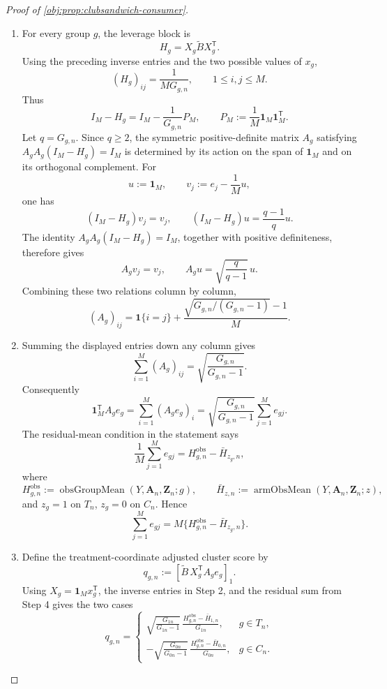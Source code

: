 \documentclass[11pt]{article}
\begin{document}
\begin{proof}[Proof of \cref{obj:prop:clubsandwich-consumer}]
\begin{enumerate}
\item
For every group \(g\), the leverage block is
\[
H_g=X_g\widetilde B X_g^{\mathsf T}.
\]
Using the preceding inverse entries and the two possible values of \(x_g\),
\[
(H_g)_{ij}
=
\frac{1}{M G_{g,n}},
\qquad
1\le i,j\le M.
\]
Thus
\[
I_M-H_g
=
I_M-\frac{1}{G_{g,n}}P_M,
\qquad
P_M:=\frac{1}{M}\mathbf 1_M\mathbf 1_M^{\mathsf T}.
\]
Let \(q=G_{g,n}\).  Since \(q\ge2\), the symmetric positive-definite matrix
\(A_g\) satisfying \(A_gA_g(I_M-H_g)=I_M\) is determined by its action on the
span of \(\mathbf 1_M\) and on its orthogonal complement.  For
\[
u:=\mathbf 1_M,
\qquad
v_j:=e_j-\frac1M u,
\]
one has
\[
(I_M-H_g)v_j=v_j,
\qquad
(I_M-H_g)u=\frac{q-1}{q}u.
\]
The identity \(A_gA_g(I_M-H_g)=I_M\), together with positive definiteness,
therefore gives
\[
A_gv_j=v_j,
\qquad
A_gu=\sqrt{\frac{q}{q-1}}\,u.
\]
Combining these two relations column by column,
\[
(A_g)_{ij}
=
\mathbf 1\{i=j\}
+
\frac{\sqrt{G_{g,n}/(G_{g,n}-1)}-1}{M}.
\]

\item
Summing the displayed entries down any column gives
\[
\sum_{i=1}^{M}(A_g)_{ij}
=
\sqrt{\frac{G_{g,n}}{G_{g,n}-1}}.
\]
Consequently
\[
\mathbf 1_M^{\mathsf T}A_ge_g
=
\sum_{i=1}^{M}(A_ge_g)_i
=
\sqrt{\frac{G_{g,n}}{G_{g,n}-1}}
\sum_{j=1}^{M}e_{gj}.
\]
The residual-mean condition in the statement says
\[
\frac1M\sum_{j=1}^{M}e_{gj}
=
H_{g,n}^{\mathrm{obs}}-\bar H_{z_g,n},
\]
where
\[
H_{g,n}^{\mathrm{obs}}:=\operatorname{obsGroupMean}(Y,\mathbf A_n,\mathbf Z_n;g),
\qquad
\bar H_{z,n}:=\operatorname{armObsMean}(Y,\mathbf A_n,\mathbf Z_n;z),
\]
and \(z_g=1\) on \(T_n\), \(z_g=0\) on \(C_n\).  Hence
\[
\sum_{j=1}^{M}e_{gj}
=
M\{H_{g,n}^{\mathrm{obs}}-\bar H_{z_g,n}\}.
\]

\item
Define the treatment-coordinate adjusted cluster score by
\[
q_{g,n}
:=
\left[
\widetilde B\,X_g^{\mathsf T}A_ge_g
\right]_1 .
\]
Using \(X_g=\mathbf 1_Mx_g^{\mathsf T}\), the inverse entries in Step 2, and the
residual sum from Step 4 gives the two cases
\[
q_{g,n}
=
\begin{cases}
\displaystyle
\sqrt{\frac{G_{1n}}{G_{1n}-1}}\,
\frac{H_{g,n}^{\mathrm{obs}}-\bar H_{1,n}}{G_{1n}},
& g\in T_n,\\[1.2em]
\displaystyle
-\sqrt{\frac{G_{0n}}{G_{0n}-1}}\,
\frac{H_{g,n}^{\mathrm{obs}}-\bar H_{0,n}}{G_{0n}},
& g\in C_n.
\end{cases}
\]


\end{enumerate}
\end{proof}
\end{document}
